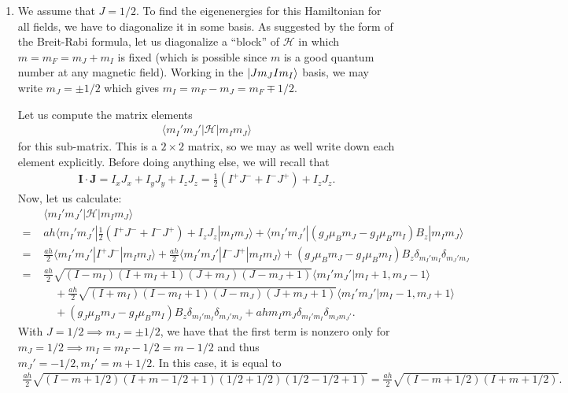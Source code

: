 \documentclass{article}
\theoremstyle{definition}
\newcommand{\ham}{\mathcal{H}}
\newcommand{\f}[2]{\frac{#1}{#2}}
\begin{document}
\begin{enumerate}[label=(\alph*)]
	\item We assume that $J=1/2$. To find the eigenenergies for this Hamiltonian for all fields, we have to diagonalize it in some basis. As suggested by the form of the Breit-Rabi formula, let us diagonalize a ``block'' of $\ham$ in which $m = m_F = m_J + m_I$ is fixed (which is possible since $m$ is a good quantum number at any magnetic field). Working in the $\ket{Jm_J Im_I}$ basis, we may write $m_J = \pm 1/2$ which gives $m_I = m_F - m_J = m_F \mp 1/2$. 
	
	Let us compute the matrix elements
	\begin{align*}
	\langle{m_I'm_J'}| \ham |{m_I m_J}\rangle
	\end{align*}  
	for this sub-matrix. This is a $2\times 2$ matrix, so we may as well write down each element explicitly. Before doing anything else, we will recall that
	\begin{align*}
	\bm{I}\cdot \bm{J} = I_xJ_x + I_yJ_y + I_zJ_z = \f{1}{2}(I^+J^- + I^-J^+) + I_z J_z.
	\end{align*}
	Now, let us calculate:
	\begin{align*}
	\,\,&\langle{m_I'm_J'}| \ham |{m_I m_J}\rangle \\
	=\,\,& ah \langle{m_I'm_J'}| \f{1}{2}(I^+J^- + I^-J^+) + I_z J_z |{m_I m_J}\rangle + \langle{m_I'm_J'}|(g_J \mu_B m_J - g_I \mu_B m_I) B_z |{m_I m_J}\rangle \\
	=\,\,& \f{ah}{2}\langle{m_I'm_J'}|  I^+J^- |{m_I m_J}\rangle + \f{ah}{2}\langle{m_I'm_J'}|  I^-J^+ |{m_I m_J}\rangle + (g_J \mu_B m_J - g_I \mu_B m_I) B_z \delta_{m_I'm_I}\delta_{m_J'm_J}\\
	=\,\,& \f{ah}{2}\sqrt{(I-m_I)(I+m_I+1)(J+m_J)(J-m_J+1)}\langle m_I'm_J' | m_I+1,m_J-1\rangle\\
	&\quad +  \f{ah}{2}\sqrt{(I+m_I)(I-m_I+1)(J-m_J)(J+m_J+1)}\langle m_I'm_J' | m_I-1,m_J+1\rangle \\
	&\quad + (g_J \mu_B m_J - g_I \mu_B m_I) B_z \delta_{m_I'm_I}\delta_{m_J'm_J} + ahm_I m_J \delta_{m_I'm_I}\delta_{m_J m_J'}.
	\end{align*}
	With $J=1/2 \implies m_J = \pm 1/2$, we have that the first term is nonzero only for $m_J=1/2 \implies m_I = m_F-1/2 = m-1/2$ and thus $m_J'=-1/2, m_I' = m+1/2$. In this case, it is equal to 
	\begin{align*}
	\f{ah}{2}\sqrt{(I-m+1/2)(I+m-1/2+1)(1/2+1/2)(1/2-1/2+1)} = \f{ah}{2}\sqrt{(I-m+1/2)(I+m+1/2)}.
	\end{align*}

\end{enumerate}
\end{document}
